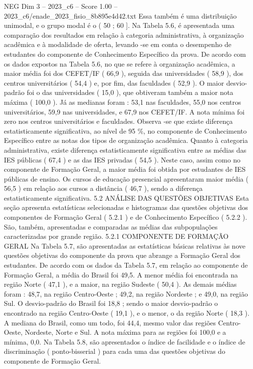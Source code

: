 \begin{textsample}{NEG Dim 3 – 2023\_c6 – Score 1.00 – 2023\_c6/enade\_2023\_fisio\_8b895e4d42.txt}
Essa também é uma distribuição unimodal, e o grupo modal é o ( 50 ; 60 ].
Na Tabela 5.6, é apresentada uma comparação dos resultados em relação à categoria administrativa, à organização acadêmica e à modalidade de oferta, levando -se em conta o desempenho de estudantes do componente de Conhecimento Específico da prova.
De acordo com os dados expostos na Tabela 5.6, no que se refere à organização acadêmica, a maior média foi dos CEFET/IF ( 66,9 ), seguida das universidades ( 58,9 ), dos centros universitários ( 54,4 ) e, por fim, das faculdades ( 52,9 ).
O maior desvio-padrão foi o das universidades ( 15,0 ), que obtiveram também a maior nota máxima ( 100,0 ).
Já as medianas foram : 53,1 nas faculdades, 55,0 nos centros universitários, 59,9 nas universidades, e 67,9 nos CEFET/IF.
A nota mínima foi zero nos centros universitários e faculdades.
Observa -se que existe diferença estatisticamente significativa, ao nível de 95 \%, no componente de Conhecimento Específico entre as notas dos tipos de organização acadêmica.
Quanto à categoria administrativa, existe diferença estatisticamente significativa entre as médias das IES públicas ( 67,4 ) e as das IES privadas ( 54,5 ).
Neste caso, assim como no componente de Formação Geral, a maior média foi obtida por estudantes de IES públicas de ensino.
Os cursos de educação presencial apresentaram maior média ( 56,5 ) em relação aos cursos a distância ( 46,7 ), sendo a diferença estatisticamente significativa. 5.2 ANÁLISE DAS QUESTÕES OBJETIVAS Esta seção apresenta estatísticas selecionadas e histogramas das questões objetivas dos componentes de Formação Geral ( 5.2.1 ) e de Conhecimento Específico ( 5.2.2 ).
São, também, apresentadas e comparadas as médias das subpopulações caracterizadas por grande região. 5.2.1 COMPONENTE DE FORMAÇÃO GERAL Na Tabela 5.7, são apresentadas as estatísticas básicas relativas às nove questões objetivas do componente da prova que abrange a Formação Geral dos estudantes.
De acordo com os dados da Tabela 5.7, em relação ao componente de Formação Geral, a média do Brasil foi 49,5.
A menor média foi encontrada na região Norte ( 47,1 ), e a maior, na região Sudeste ( 50,4 ).
As demais médias foram : 48,7, na região Centro-Oeste ; 49,2, na região Nordeste ; e 49,0, na região Sul.
O desvio-padrão do Brasil foi 18,8 ; sendo o maior desvio-padrão o encontrado na região Centro-Oeste ( 19,1 ), e o menor, o da região Norte ( 18,3 ).
A mediana do Brasil, como um todo, foi 44,4, mesmo valor das regiões Centro-Oeste, Nordeste, Norte e Sul.
A nota máxima para as regiões foi 100,0 e a mínima, 0,0.
Na Tabela 5.8, são apresentados o índice de facilidade e o índice de discriminação ( ponto-bisserial ) para cada uma das questões objetivas do componente de Formação Geral.

\end{textsample}
